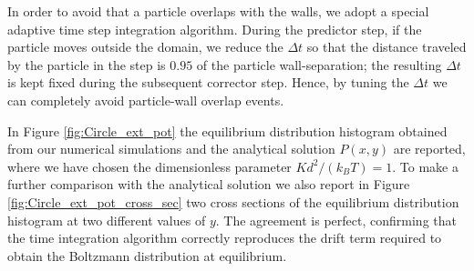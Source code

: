 In order to avoid that a particle overlaps with the walls, we adopt a special adaptive time step integration algorithm. During the predictor step, if the particle moves outside the domain, we reduce the $\Delta t$ so that the distance traveled by the particle in the step is $0.95$ of the particle wall-separation; the resulting $\Delta t$ is kept fixed during the subsequent corrector step. Hence, by tuning the $\Delta t$ we can completely avoid particle-wall overlap events.

In Figure \ref{fig:Circle_ext_pot} the equilibrium distribution histogram obtained from our numerical simulations and the analytical solution $P(x,y)$ are reported, where we have chosen the dimensionless parameter $K d^{2}/({k_{B}T})=1$. To make a further comparison with the analytical solution we also report in Figure \ref{fig:Circle_ext_pot_cross_sec} two cross sections of the equilibrium distribution histogram at two different values of $y$. The agreement is perfect, confirming that the time integration algorithm correctly reproduces the drift term required to obtain the Boltzmann distribution at equilibrium.


